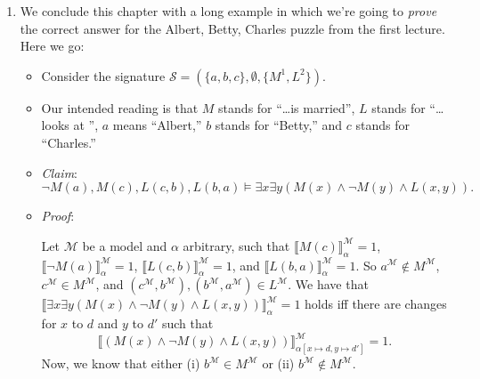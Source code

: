 \begin{enumerate}[\thesection.1]
\begin{theorem}
\begin{enumerate}[1.]
				\item $\Gamma\vDash\phi$
				
				\item $\Gamma\cup\{\neg\phi\}$ is unsatisfiable
			
			\end{enumerate}
			\end{theorem} 
			\begin{proof}
			Exactly as in 6.2.6.
			\end{proof}
		However, as we'll see in the next chapter, the deduction theorem doesn't give us decidability anymore. We can use it, however, to derive interesting logical truths, such as \[\vDash \forall x\phi\to (\phi)[x:=t]\] for $t$ a ground term, which we can infer directly from 9.4.3.i. The I Can't Get No Satisfaction Theorem, instead, will play the same role in first-order logic as in propositional logic: it's the foundation of the tableau method, which we'll discuss in the next chapter. 
		
		\item We conclude this chapter with a long example in which we're going to \emph{prove} the correct answer for the Albert, Betty, Charles puzzle from the first lecture. Here we go:
		
		\begin{itemize}
		
		\item Consider the signature $\mathcal{S}=(\{a,b,c\}, \emptyset, \{M^1, L^2\})$.

		\item Our intended reading is that $M$ stands for ``\dots is married'', $L$ stands for ``\dots looks at \underline{\phantom{\dots}}'', $a$ means ``Albert,'' $b$ stands for ``Betty,'' and $c$ stands for ``Charles.''
		
		\item \emph{Claim}: \[\neg M(a), M(c), L(c,b), L(b,a)\vDash \exists x\exists y(M(x)\land \neg M(y)\land L(x,y)).\]
		
		\item \emph{Proof}: 	
		
		Let $\mathcal{M}$ be a model and $\alpha$ arbitrary, such that $\llbracket M(c)\rrbracket_\alpha^\mathcal{M}=1$, $\llbracket\neg M(a)\rrbracket_\alpha^\mathcal{M}=1$, $\llbracket L(c,b)\rrbracket_\alpha^\mathcal{M}=1$, and $\llbracket L(b,a)\rrbracket_\alpha^\mathcal{M}=1$. So $a^\mathcal{M}\notin M^\mathcal{M}$, $c^\mathcal{M}\in M^\mathcal{M}$, and $( c^\mathcal{M}, b^\mathcal{M}), ( b^\mathcal{M}, a^\mathcal{M})\in L^\mathcal{M}$. We have that $\llbracket \exists x\exists y(M(x)\land \neg M(y)\land L(x,y))\rrbracket_\alpha^\mathcal{M}=1$ holds iff there are changes for $x$ to $d$ and $y$ to $d'$ such that \[\llbracket (M(x)\land \neg M(y)\land L(x,y))\rrbracket_{\alpha[x\mapsto d, y\mapsto d']}^\mathcal{M}=1.\] Now, we know that either (i) $b^\mathcal{M}\in M^\mathcal{M}$ or (ii) $b^\mathcal{M}\notin M^\mathcal{M}$. 	
		

\end{itemize}
\end{enumerate}
